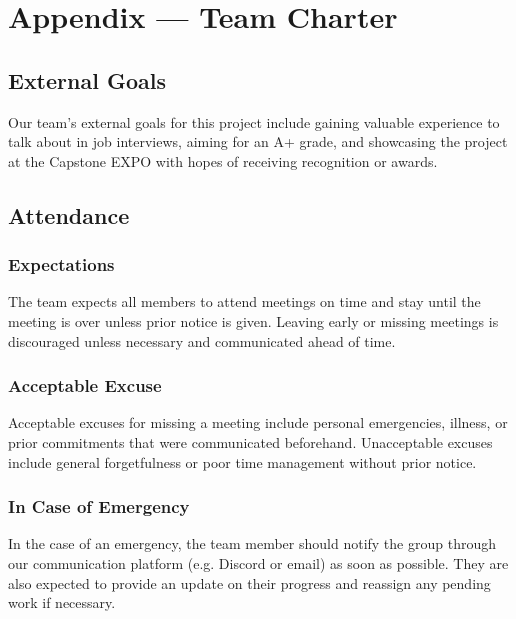 \documentclass{article}
\begin{document}
\newpage{}

\section*{Appendix --- Team Charter}


\subsection*{External Goals}

Our team’s external goals for this project include gaining valuable experience to talk
about in job interviews, aiming for an A+ grade, and showcasing the project at the Capstone
EXPO with hopes of receiving recognition or awards.

\subsection*{Attendance}

\subsubsection*{Expectations}

The team expects all members to attend meetings on time and stay until the meeting is over
unless prior notice is given. Leaving early or missing meetings is discouraged unless 
necessary and communicated ahead of time.

\subsubsection*{Acceptable Excuse}

Acceptable excuses for missing a meeting include personal emergencies, illness, or prior
commitments that were communicated beforehand. Unacceptable excuses include general
forgetfulness or poor time management without prior notice.

\subsubsection*{In Case of Emergency}

In the case of an emergency, the team member should notify the group through our communication
platform (e.g. Discord or email) as soon as possible. They are also expected to provide an update
on their progress and reassign any pending work if necessary.
\end{document}
